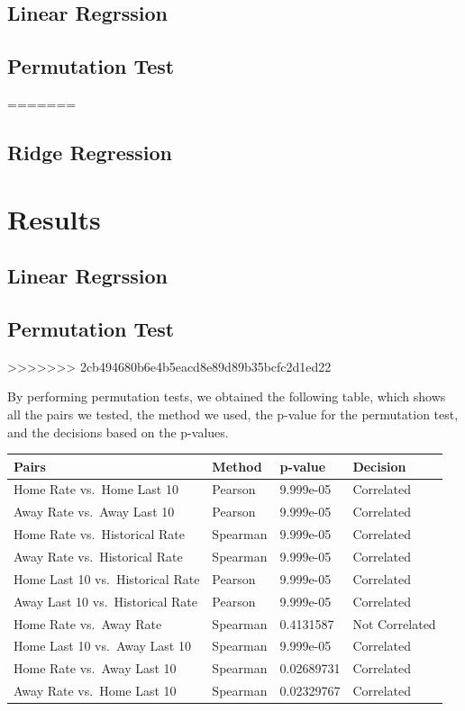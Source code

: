 \documentclass[]{article}
\begin{document}
\hypertarget{linear-regrssion}{%
\subsection{Linear Regrssion}\label{linear-regrssion}}

\hypertarget{permutation-test-1}{%
\subsection{Permutation Test}\label{permutation-test-1}}
=======
\subsection{Ridge Regression}\label{ridge-regression}

\section{Results}\label{results}

\subsection{Linear Regrssion}\label{linear-regrssion}

\subsection{Permutation Test}\label{permutation-test-1}
>>>>>>> 2cb494680b6e4b5eacd8e89d89b35bcfc2d1ed22

By performing permutation tests, we obtained the following table, which
shows all the pairs we tested, the method we used, the p-value for the
permutation test, and the decisions based on the p-values.

\begin{longtable}[]{@{}llll@{}}
\toprule
Pairs & Method & p-value & Decision\tabularnewline
\midrule
\endhead
Home Rate vs.~Home Last 10 & Pearson & 9.999e-05 &
Correlated\tabularnewline
Away Rate vs.~Away Last 10 & Pearson & 9.999e-05 &
Correlated\tabularnewline
Home Rate vs.~Historical Rate & Spearman & 9.999e-05 &
Correlated\tabularnewline
Away Rate vs.~Historical Rate & Spearman & 9.999e-05 &
Correlated\tabularnewline
Home Last 10 vs.~Historical Rate & Pearson & 9.999e-05 &
Correlated\tabularnewline
Away Last 10 vs.~Historical Rate & Pearson & 9.999e-05 &
Correlated\tabularnewline
Home Rate vs.~Away Rate & Spearman & 0.4131587 & Not
Correlated\tabularnewline
Home Last 10 vs.~Away Last 10 & Spearman & 9.999e-05 &
Correlated\tabularnewline
Home Rate vs.~Away Last 10 & Spearman & 0.02689731 &
Correlated\tabularnewline
Away Rate vs.~Home Last 10 & Spearman & 0.02329767 &
Correlated\tabularnewline
\bottomrule
\end{longtable}
\end{document}
